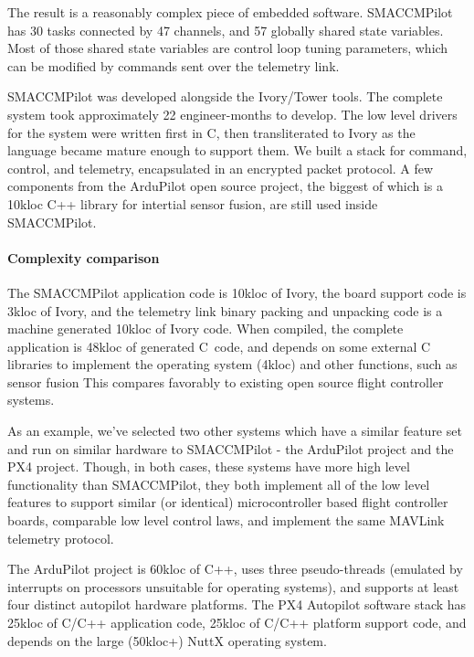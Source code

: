The result is a reasonably complex piece of embedded software. SMACCMPilot has
30 tasks connected by 47 channels, and 57 globally shared state variables. Most
of those shared state variables are control loop tuning parameters, which can be
modified by commands sent over the telemetry link.

SMACCMPilot was developed alongside the Ivory/Tower tools.  The complete system
took approximately 22 engineer-months to develop.  The low level drivers for the
system were written first in C, then transliterated to Ivory as the language
became mature enough to support them. We built a stack for command, control, and
telemetry, encapsulated in an encrypted packet protocol. A few components from
the ArduPilot open source project, the biggest of which is a 10kloc C++ library
for intertial sensor fusion, are still used inside SMACCMPilot.

\paragraph{Complexity comparison}
The SMACCMPilot application code is 10kloc of Ivory, the board support code
is 3kloc of Ivory, and the telemetry link binary packing and unpacking
code is a machine generated 10kloc of Ivory code. When compiled, the complete
application
is 48kloc of generated C~code, and depends on some external C libraries to
implement the operating system (4kloc) and other functions, such as sensor
fusion  This compares favorably to existing open
source flight controller systems.

As an example, we've selected two other systems which have a similar feature set
and run on similar hardware to SMACCMPilot - the ArduPilot
project\cite{apm-proj} and the PX4 project. Though, in
both cases, these systems have more high level functionality than SMACCMPilot,
they both implement all of the low level features to support similar (or
identical) microcontroller based flight controller boards, comparable low level
control laws, and implement the same MAVLink telemetry protocol.

The ArduPilot project is 60kloc of C++, uses three pseudo-threads (emulated by
interrupts on processors unsuitable for operating systems), and supports at
least four distinct autopilot hardware platforms. The PX4 Autopilot software
stack has 25kloc of C/C++ application code, 25kloc of C/C++ platform support
code, and depends on the large (50kloc+) NuttX operating system.

